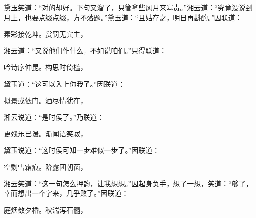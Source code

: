 \begin{parag}
    黛玉笑道：“对的却好。下句又溜了，只管拿些风月来塞责。”湘云道：“究竟没说到月上，也要点缀点缀，方不落题。”黛玉道：“且姑存之，明日再斟酌。”因联道：
\end{parag}
\begin{poem}
    \begin{pl}
        素彩接乾坤。赏罚无宾主，
    \end{pl}
\end{poem}
\begin{parag}
    湘云道：“又说他们作什么，不如说咱们。”只得联道：
\end{parag}
\begin{poem}
    \begin{pl}
        吟诗序仲昆。构思时倚槛，
    \end{pl}
\end{poem}
\begin{parag}
    黛玉道：“这可以入上你我了。”因联道：
\end{parag}


\begin{poem}
    \begin{pl}
        拟景或依门。酒尽情犹在，
    \end{pl}
\end{poem}

\begin{parag}
    湘云说道：“是时侯了。”乃联道：
\end{parag}


\begin{poem}
    \begin{pl}
        更残乐已谖。渐闻语笑寂，
    \end{pl}
\end{poem}

\begin{parag}
    黛玉说道：“这时侯可知一步难似一步了。”因联道：
\end{parag}
\begin{poem}
    \begin{pl}
        空剩雪霜痕。阶露团朝菌，
    \end{pl}
\end{poem}
\begin{parag}
    湘云笑道：“这一句怎么押韵，让我想想。”因起身负手，想了一想，笑道：“够了，幸而想出一个字来，几乎败了。”因联道：
\end{parag}


\begin{poem}
    \begin{pl}

        庭烟敛夕棔。秋湍泻石髓，
    \end{pl}
\end{poem}

